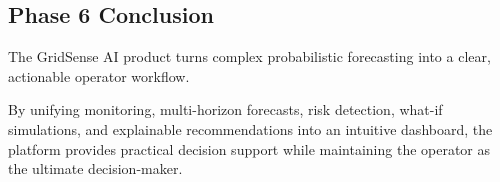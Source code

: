\subsection{Phase 6 Conclusion}
\label{subsec:phase6_conclusion}

The GridSense AI product turns complex probabilistic forecasting into a clear, actionable operator workflow. 

By unifying monitoring, multi-horizon forecasts, risk detection, what-if simulations, and explainable recommendations into an intuitive dashboard, the platform provides practical decision support while maintaining the operator as the ultimate decision-maker.
